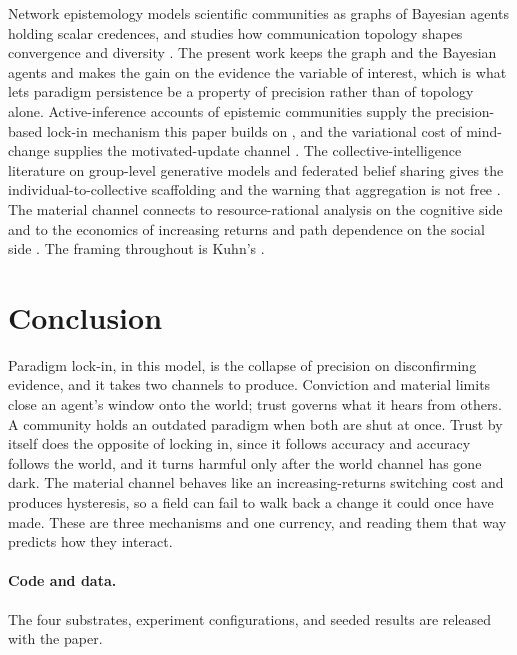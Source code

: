 \documentclass[11pt]{article}
\begin{document}
Network epistemology models scientific communities as graphs of Bayesian agents
holding scalar credences, and studies how communication topology shapes
convergence and diversity
\citep{zollman2010TransientDiversity,oconnorWeatherall2019Misinformation}. The
present work keeps the graph and the Bayesian agents and makes the gain on the
evidence the variable of interest, which is what lets paradigm persistence be a
property of precision rather than of topology alone. Active-inference accounts of
epistemic communities supply the precision-based lock-in mechanism this paper
builds on \citep{albarracin2022EpistemicCommunities}, and the variational cost of
mind-change supplies the motivated-update channel
\citep{hylandAlbarracin2025MindChange}. The collective-intelligence literature
on group-level generative models and federated belief sharing gives the
individual-to-collective scaffolding and the warning that aggregation is not free
\citep{friston2023Federated,catal2024BeliefSharing,heins2024CollectiveBehavior,
waade2025AsOneAndMany,friston2024Ecosystems}. The material channel connects to
resource-rational analysis on the cognitive side
\citep{liederGriffiths2020ResourceRational} and to the economics of increasing
returns and path dependence on the social side
\citep{arthur1994IncreasingReturns,david1985QWERTY}. The framing throughout is
Kuhn's \citep{kuhn1962Structure}.

\section{Conclusion}

Paradigm lock-in, in this model, is the collapse of precision on disconfirming
evidence, and it takes two channels to produce. Conviction and material limits
close an agent's window onto the world; trust governs what it hears from others.
A community holds an outdated paradigm when both are shut at once. Trust by
itself does the opposite of locking in, since it follows accuracy and accuracy
follows the world, and it turns harmful only after the world channel has gone
dark. The material channel behaves like an increasing-returns switching cost and
produces hysteresis, so a field can fail to walk back a change it could once
have made. These are three mechanisms and one currency, and reading them that
way predicts how they interact.

\paragraph{Code and data.} The four substrates, experiment configurations, and
seeded results are released with the paper.


\end{document}
